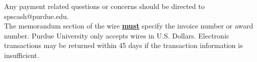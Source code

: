 Any payment related questions or concerns should be directed to spscash@purdue.edu.\\

The memorandum section of the wire \textbf{\underline{must}} specify the invoice number or award number. Purdue University only accepts wires in U.S. Dollars. Electronic transactions may be returned within 45 days if the transaction information is insufficient.
